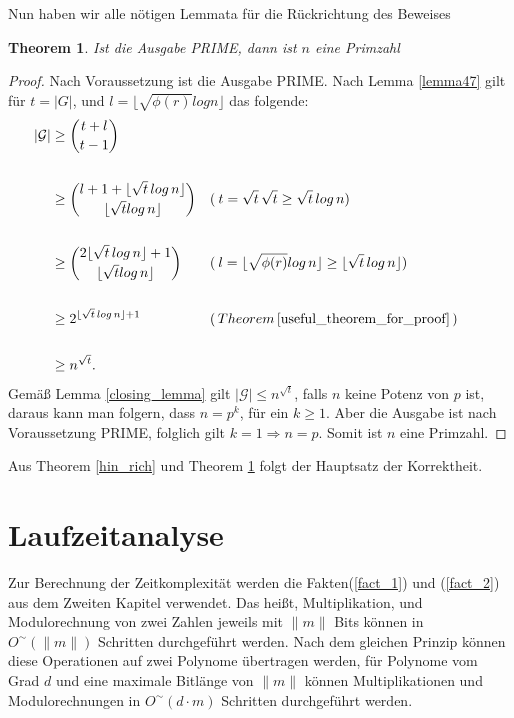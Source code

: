 \documentclass[12pt,oneside]{article}
\newtheorem{theorem}{Theorem}[section]
\theoremstyle{remark}
\theoremstyle{definition}
\begin{document}
Nun haben wir alle nötigen Lemmata für die Rückrichtung des Beweises

\begin{theorem}\label{rueck_rich}
Ist die Ausgabe PRIME, dann ist $n$ eine Primzahl 
\end{theorem}

\begin{proof}
Nach Voraussetzung ist die Ausgabe PRIME. Nach Lemma \ref{lemma47} gilt für $t = |G|$, und $l = \lfloor \sqrt{\phi(r)} log n \rfloor$ das folgende:\newline
\begin{align*}
|\mathcal{G}| & \geq {t + l \choose t - 1} \\
\\
& \geq {l + 1 + \lfloor \sqrt{t} \, log \, n \rfloor \choose \lfloor \sqrt{t} log \, n \rfloor} && ( \: t = \sqrt{t} \,
\sqrt{t} \geq \sqrt{t} \,  log \, n) && \\
\\
& \geq {2 \lfloor \sqrt{t} \, log \,  n \rfloor + 1 \choose \lfloor \sqrt{t} log \, n \rfloor} && ( \: l = \lfloor \sqrt{\phi(r)} log \, n \rfloor \geq \lfloor \sqrt{t} \, log \, n \rfloor)\\
\\
&\geq 2^{\lfloor \sqrt{t} \, log \, n \rfloor + 1} &&(\,  Theorem \,  \ref{useful_theorem_for_proof} \, )\\
\\
&\geq n^{\sqrt{t}}.
\end{align*}
Gemäß Lemma \ref{closing_lemma} gilt $|\mathcal{G}| \leq n^{\sqrt{t}}$, falls $n$ keine Potenz von $p$ ist, daraus kann man folgern, dass $n = p^k$, für ein $k \geq 1$. Aber die Ausgabe ist nach Voraussetzung PRIME, folglich gilt $ k= 1 \Rightarrow n = p$. Somit ist $n$ eine Primzahl.
\end{proof}

Aus Theorem \ref{hin_rich} und Theorem \ref{rueck_rich} folgt der Hauptsatz der Korrektheit. 
\section{Laufzeitanalyse}
Zur Berechnung der Zeitkomplexität werden die Fakten(\ref{fact_1}) und (\ref{fact_2}) aus dem Zweiten Kapitel verwendet. Das heißt, Multiplikation, und Modulorechnung von zwei Zahlen jeweils mit $\lVert m \rVert$ Bits können in $O^{\sim}(\lVert m \rVert)$ Schritten durchgeführt werden. Nach dem gleichen Prinzip können diese Operationen auf zwei Polynome übertragen werden, für Polynome vom Grad $d$ und eine maximale Bitlänge von $\lVert m \rVert$ können Multiplikationen und Modulorechnungen in $O^{\sim}(d \cdot m)$ Schritten durchgeführt werden.
\end{document}
